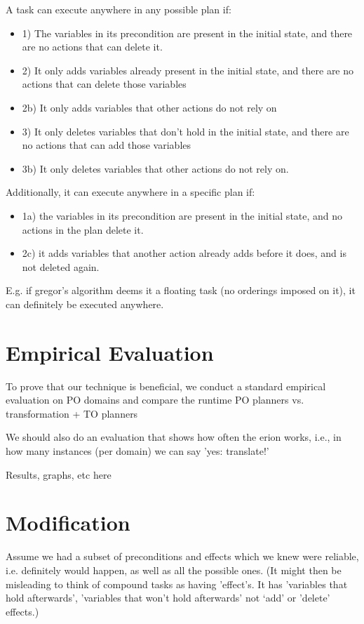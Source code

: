 A task can execute anywhere in any possible plan if: 
\begin{itemize}
\item 1) The variables in its precondition are present in the initial state, and there are no actions that can delete it.
\item 2) It only adds variables already present in the initial state, and there are no actions that can delete those variables
\item 2b) It only adds variables that other actions do not rely on
\item 3) It only deletes variables that don't hold in the initial state, and there are no actions that can add those variables
\item 3b) It only deletes variables that other actions do not rely on.
\end{itemize}


Additionally, it can execute anywhere in a specific plan if:
\begin{itemize}
\item 1a) the variables in its precondition are present in the initial state, and no actions in the plan delete it.
\item 2c) it adds variables that another action already adds before it does, and is not deleted again.
\end{itemize} 

E.g. if gregor's algorithm deems it a floating task (no orderings imposed on it),
it can definitely be executed anywhere.


\section{Empirical Evaluation}

To prove that our technique is beneficial, we conduct a standard empirical evaluation on PO domains and compare the runtime PO planners vs. transformation + TO planners

We should also do an evaluation that shows how often the erion works, i.e., in how many instances (per domain) we can say 'yes: translate!'

Results, graphs, etc here


\section{Modification}
Assume we had a subset of preconditions and effects which we knew were reliable, i.e. definitely would happen,
as well as all the possible ones. (It might then be misleading to think of compound tasks as having  'effect's. It has 'variables that hold afterwards', 'variables that won't hold afterwards' not ‘add’ or 'delete' effects.)

